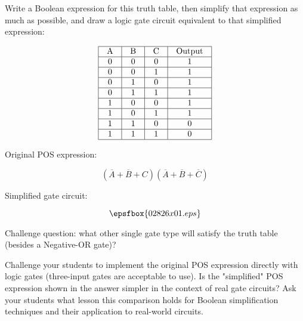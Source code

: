

Write a Boolean expression for this truth table, then simplify that expression as much as possible, and draw a logic gate circuit equivalent to that simplified expression:


$$\vbox{\offinterlineskip
\halign{\strut
\vrule \quad\hfil # \ \hfil & 
\vrule \quad\hfil # \ \hfil & 
\vrule \quad\hfil # \ \hfil & 
\vrule \quad\hfil # \ \hfil \vrule \cr
\noalign{\hrule}
%
A & B & C & Output \cr
%
\noalign{\hrule}
%
0 & 0 & 0 & 1 \cr
%
\noalign{\hrule}
%
0 & 0 & 1 & 1 \cr
%
\noalign{\hrule}
%
0 & 1 & 0 & 1 \cr
%
\noalign{\hrule}
%
0 & 1 & 1 & 1 \cr
%
\noalign{\hrule}
%
1 & 0 & 0 & 1 \cr
%
\noalign{\hrule}
%
1 & 0 & 1 & 1 \cr
%
\noalign{\hrule}
%
1 & 1 & 0 & 0 \cr
%
\noalign{\hrule}
%
1 & 1 & 1 & 0 \cr
%
\noalign{\hrule}
} %
}$$ %







Original POS expression:

$$(\overline{A} + \overline{B} + C)(\overline{A} + \overline{B} + \overline{C})$$

Simplified gate circuit:

$$\epsfbox{02826x01.eps}$$

\vskip 10pt

Challenge question: what other single gate type will satisfy the truth table (besides a Negative-OR gate)?







Challenge your students to implement the original POS expression directly with logic gates (three-input gates are acceptable to use).  Is the "simplified" POS expression shown in the answer simpler in the context of real gate circuits?  Ask your students what lesson this comparison holds for Boolean simplification techniques and their application to real-world circuits.




